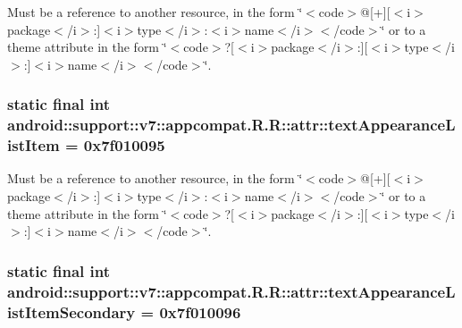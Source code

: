 Must be a reference to another resource, in the form \char`\"{}$<$code$>$@\mbox{[}+\mbox{]}\mbox{[}$<$i$>$package$<$/i$>$:\mbox{]}$<$i$>$type$<$/i$>$:$<$i$>$name$<$/i$>$$<$/code$>$\char`\"{} or to a theme attribute in the form \char`\"{}$<$code$>$?\mbox{[}$<$i$>$package$<$/i$>$:\mbox{]}\mbox{[}$<$i$>$type$<$/i$>$:\mbox{]}$<$i$>$name$<$/i$>$$<$/code$>$\char`\"{}. \hypertarget{classandroid_1_1support_1_1v7_1_1appcompat_1_1_r_1_1attr_3b634dfd7b2005f506845d90cfa5b224}{
\subsubsection[{textAppearanceListItem}]{\setlength{\rightskip}{0pt plus 5cm}static final int android::support::v7::appcompat.R.R::attr::textAppearanceListItem = 0x7f010095}}
\label{classandroid_1_1support_1_1v7_1_1appcompat_1_1_r_1_1attr_3b634dfd7b2005f506845d90cfa5b224}


Must be a reference to another resource, in the form \char`\"{}$<$code$>$@\mbox{[}+\mbox{]}\mbox{[}$<$i$>$package$<$/i$>$:\mbox{]}$<$i$>$type$<$/i$>$:$<$i$>$name$<$/i$>$$<$/code$>$\char`\"{} or to a theme attribute in the form \char`\"{}$<$code$>$?\mbox{[}$<$i$>$package$<$/i$>$:\mbox{]}\mbox{[}$<$i$>$type$<$/i$>$:\mbox{]}$<$i$>$name$<$/i$>$$<$/code$>$\char`\"{}. \hypertarget{classandroid_1_1support_1_1v7_1_1appcompat_1_1_r_1_1attr_d88f0b4a4a95bd2dea817fbce854658c}{
\subsubsection[{textAppearanceListItemSecondary}]{\setlength{\rightskip}{0pt plus 5cm}static final int android::support::v7::appcompat.R.R::attr::textAppearanceListItemSecondary = 0x7f010096}}
\label{classandroid_1_1support_1_1v7_1_1appcompat_1_1_r_1_1attr_d88f0b4a4a95bd2dea817fbce854658c}


